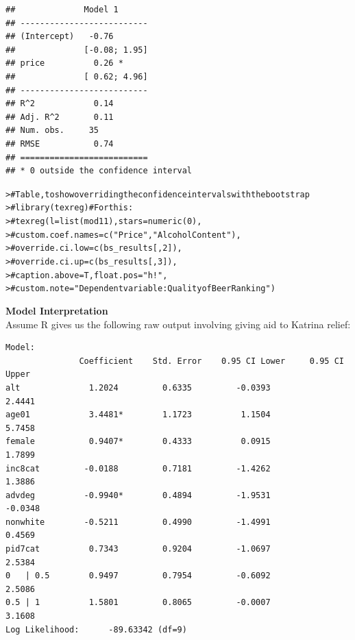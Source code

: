 \documentclass[12pt]{article}\usepackage[]{graphicx}\usepackage[]{color}
\makeatletter
\newcommand{\hlcom}[1]{\textcolor[rgb]{0.404,0.408,0.42}{#1}}%
\newcommand{\hlstd}[1]{\textcolor[rgb]{0.882,0.878,0.898}{#1}}%
\newenvironment{kframe}{%
 \def\at@end@of@kframe{}%
 \ifinner\ifhmode%
  \def\at@end@of@kframe{\end{minipage}}%
  \begin{minipage}{\columnwidth}%
 \fi\fi%
 \def\FrameCommand##1{\hskip\@totalleftmargin \hskip-\fboxsep
 \colorbox{shadecolor}{##1}\hskip-\fboxsep
     \hskip-\linewidth \hskip-\@totalleftmargin \hskip\columnwidth}%
 \MakeFramed {\advance\hsize-\width
   \@totalleftmargin\z@ \linewidth\hsize
   \@setminipage}}%
 {\par\unskip\endMakeFramed%
 \at@end@of@kframe}
\newenvironment{knitrout}{}{} %
\makeatother
\begin{document}
\begin{flushleft}
\begin{knitrout}
\begin{kframe}
\begin{verbatim}
##              Model 1      
## --------------------------
## (Intercept)   -0.76       
##              [-0.08; 1.95]
## price          0.26 *     
##              [ 0.62; 4.96]
## --------------------------
## R^2            0.14       
## Adj. R^2       0.11       
## Num. obs.     35          
## RMSE           0.74       
## ==========================
## * 0 outside the confidence interval
\end{verbatim}
\begin{alltt}
\hlstd{> }\hlcom{# Table, to show overriding the confidence intervals with the bootstrap}
\hlstd{> }\hlcom{# library(texreg) # For this:}
\hlstd{> }\hlcom{# texreg(l= list(mod11), stars = numeric(0),}
\hlstd{> }\hlcom{#        custom.coef.names = c("Price", "Alcohol Content"),}
\hlstd{> }\hlcom{#        override.ci.low = c(bs_results[, 2]),}
\hlstd{> }\hlcom{#        override.ci.up = c(bs_results[, 3]),}
\hlstd{> }\hlcom{#        caption.above = T, float.pos = "h!",}
\hlstd{> }\hlcom{#        custom.note = "Dependent variable: Quality of Beer Ranking" )}
\end{alltt}
\end{kframe}
\end{knitrout}




\noindent \textbf{Model Interpretation} \\
Assume R gives us the following raw output involving giving aid to Katrina relief:
\begin{verbatim}
Model:
               Coefficient    Std. Error    0.95 CI Lower     0.95 CI Upper
alt              1.2024         0.6335         -0.0393            2.4441
age01            3.4481*        1.1723          1.1504            5.7458
female           0.9407*        0.4333          0.0915            1.7899
inc8cat         -0.0188         0.7181         -1.4262            1.3886
advdeg          -0.9940*        0.4894         -1.9531           -0.0348
nonwhite        -0.5211         0.4990         -1.4991            0.4569
pid7cat          0.7343         0.9204         -1.0697            2.5384
0   | 0.5        0.9497         0.7954         -0.6092            2.5086
0.5 | 1          1.5801         0.8065         -0.0007            3.1608
Log Likelihood:      -89.63342 (df=9)
\end{verbatim}


\end{flushleft}
\end{document}
